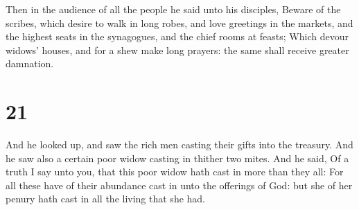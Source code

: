  Then in the audience of all the people he said unto his
disciples,  Beware of the scribes, which desire to walk in
long robes, and love greetings in the markets, and the highest seats in
the synagogues, and the chief rooms at feasts;  Which
devour widows' houses, and for a shew make long prayers: the same shall
receive greater damnation.

\hypertarget{section-20}{%
\section{21}\label{section-20}}

 And he looked up, and saw the rich men casting their gifts
into the treasury.  And he saw also a certain poor widow
casting in thither two mites.  And he said, Of a truth I say
unto you, that this poor widow hath cast in more than they all:
 For all these have of their abundance cast in unto the
offerings of God: but she of her penury hath cast in all the living that
she had.

